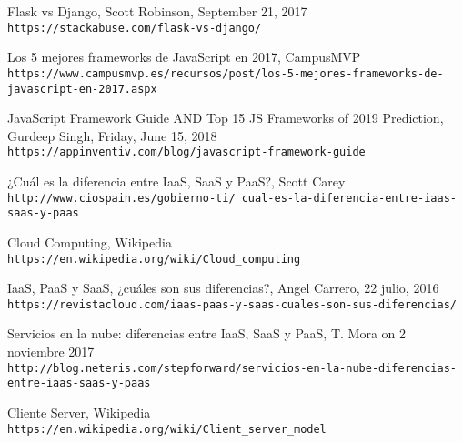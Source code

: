 \begin{thebibliography}{999}
Flask vs Django, Scott Robinson, September 21, 2017
\\\texttt{https://stackabuse.com/flask-vs-django/}

Los 5 mejores frameworks de JavaScript en 2017, CampusMVP
\\\texttt{https://www.campusmvp.es/recursos/post/los-5-mejores-frameworks-de-javascript-en-2017.aspx}

JavaScript Framework Guide AND Top 15 JS Frameworks of 2019 Prediction, Gurdeep Singh, Friday, June 15, 2018
\\\texttt{https://appinventiv.com/blog/javascript-framework-guide}

¿Cuál es la diferencia entre IaaS, SaaS y PaaS?, Scott Carey 
\\\texttt{http://www.ciospain.es/gobierno-ti/
cual-es-la-diferencia-entre-iaas-saas-y-paas}

Cloud Computing, Wikipedia
\\\texttt{https://en.wikipedia.org/wiki/Cloud\_computing}

IaaS, PaaS y SaaS, ¿cuáles son sus diferencias?, Angel Carrero, 22 julio, 2016 
\\\texttt{https://revistacloud.com/iaas-paas-y-saas-cuales-son-sus-diferencias/}

Servicios en la nube: diferencias entre IaaS, SaaS y PaaS,  T. Mora on 2 noviembre 2017 
\\\texttt{http://blog.neteris.com/stepforward/servicios-en-la-nube-diferencias-entre-iaas-saas-y-paas}

Cliente Server, Wikipedia
\\\texttt{https://en.wikipedia.org/wiki/Client\_server\_model}


\end{thebibliography}

